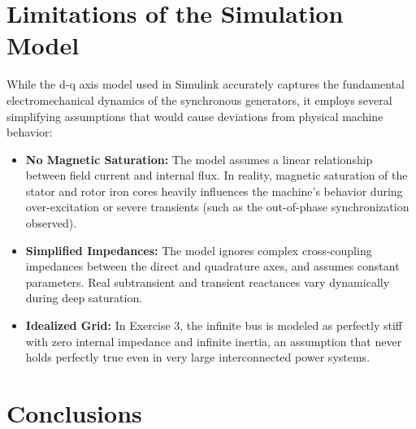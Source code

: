 \documentclass[12pt, a4paper]{article}
\begin{document}
\newpage

\section{Limitations of the Simulation Model}

While the d-q axis model used in Simulink accurately captures the fundamental electromechanical dynamics of the synchronous generators, it employs several simplifying assumptions that would cause deviations from physical machine behavior:
\begin{itemize}
    \item \textbf{No Magnetic Saturation:} The model assumes a linear relationship between field current and internal flux. In reality, magnetic saturation of the stator and rotor iron cores heavily influences the machine's behavior during over-excitation or severe transients (such as the out-of-phase synchronization observed).
    \item \textbf{Simplified Impedances:} The model ignores complex cross-coupling impedances between the direct and quadrature axes, and assumes constant parameters. Real subtransient and transient reactances vary dynamically during deep saturation.
    \item \textbf{Idealized Grid:} In Exercise 3, the infinite bus is modeled as perfectly stiff with zero internal impedance and infinite inertia, an assumption that never holds perfectly true even in very large interconnected power systems.
\end{itemize}

\newpage

\section{Conclusions}
\end{document}
